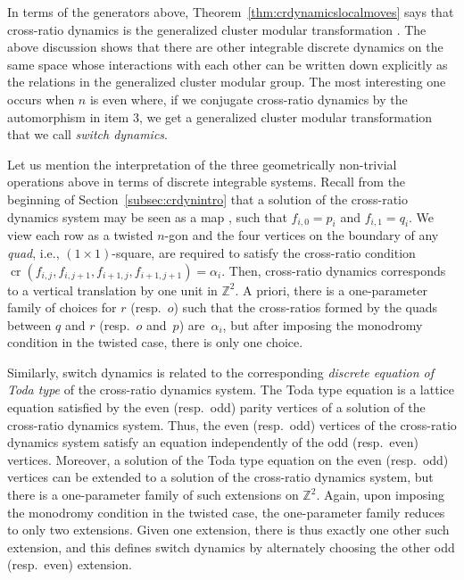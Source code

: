 \documentclass[pdftex]{sigma}
\numberwithin{equation}{section}
\newcommand{\myarrow}[1][-45]{%
	\mathrel{%
		\text{$
			\begin{tikzpicture}[baseline = -0.5ex]
				\node[inner sep=0pt,outer sep=0pt,rotate = #1] (a) at (0,0) {$\xrightarrow{}$};
			\end{tikzpicture}
			$}%
	}%
}%
\newcommand{\Z}{{\mathbb Z}}
\newcommand{\CP}{{\mathbb C\mathrm P}}
\newcommand{\ra}{\rightarrow}
\def\cro{\operatorname{cr}}
\begin{document}
	In terms of the generators above, Theorem~\ref{thm:crdynamicslocalmoves} says that cross-ratio dynamics is the generalized cluster modular transformation \smash{$\tau_{\ra} \tau_{\myarrow[135]}^{-1} s_{1,\ra}$}. The above discussion shows that there are other integrable discrete dynamics on the same space whose interactions with each other can be written down explicitly as the relations in the generalized cluster modular group. The most interesting one occurs when $n$ is even where, if we conjugate cross-ratio dynamics by the automorphism in item 3, we get a generalized cluster modular transformation that we call \textit{switch dynamics}.
	
Let us mention the interpretation of the three geometrically non-trivial operations above in terms of {discrete integrable systems}. Recall from the beginning of Section~\ref{subsec:crdynintro} that a solution of the cross-ratio dynamics system may be seen as a map \smash{$f\colon \Z^2 \rightarrow \CP^1$}, such that ${f_{i,0}=p_i}$ and ${f_{i,1}=q_i}$. We view each row as a twisted $n$-gon and the four vertices on the boundary of any \textit{quad}, i.e., $(1 \times 1)$-square, are required to satisfy the cross-ratio condition $\cro({f_{i,j}, f_{i,j+1},f_{i+1,j},f_{i+1,j+1}})=\alpha_i$. Then, cross-ratio dynamics corresponds to a vertical translation by one unit in $\Z^2$. A priori, there is a one-parameter family of choices for $r$ (resp.~$o$) such that the cross-ratios formed by the quads between $q$ and $r$ (resp.~$o$ and~$p$) are~$\alpha_i$, but after imposing the monodromy condition in the twisted case, there is only one choice.
	
	Similarly, switch dynamics is related to the corresponding \emph{discrete equation of Toda type} \cite{bsintegrablequads} of the cross-ratio dynamics system. The Toda type equation is a lattice equation satisfied by the even (resp.\ odd) parity vertices of a solution of the cross-ratio dynamics system. Thus, the even (resp.\ odd) vertices of the cross-ratio dynamics system satisfy an equation independently of the odd (resp.\ even) vertices. Moreover, a solution of the Toda type equation on the even (resp.\ odd) vertices can be extended to a solution of the cross-ratio dynamics system, but there is a one-parameter family of such extensions on $\Z^2$. Again, upon imposing the monodromy condition in the twisted case, the one-parameter family reduces to only two extensions. Given one extension, there is thus exactly one other such extension, and this defines switch dynamics by alternately choosing the other odd (resp.\ even) extension.
	
\end{document}
